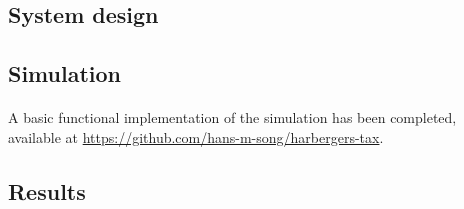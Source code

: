 \subsection{System design} %


\subsection{Simulation}

\paragraph{} A basic functional implementation of the simulation has been completed, available at \url{https://github.com/hans-m-song/harbergers-tax}. 

\begin{algorithm}
  \begin{algorithmic}[1]
     
          \EndIf
        \EndFor
      \EndFor
    \EndProcedure
  \end{algorithmic}
\end{algorithm}

\subsection{Results}

